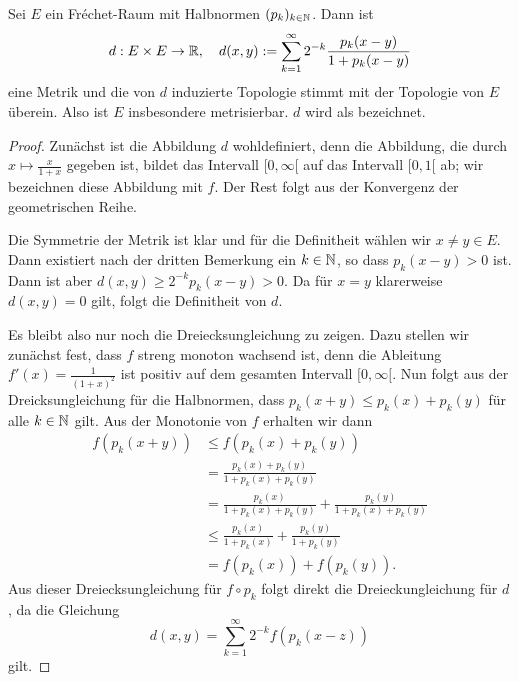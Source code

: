 \begin{prop}
  \label{prop:frechet-metrik}
  Sei $E$ ein Fr\'echet-Raum mit Halbnormen $(p_k)_{k \in \mathbb{N}}$. Dann
  ist
  \[
  d: E \times E \rightarrow \mathbb{R}, \quad d(x,y) := \sum_{k=1}^\infty 2^{-k}
  \frac{p_k(x-y)}{1 + p_k(x-y)}
  \]
  eine Metrik und die von $d$ induzierte Topologie stimmt mit der
  Topologie von $E$ überein. Also ist $E$ insbesondere
  metrisierbar. $d$ wird als  bezeichnet.
\end{prop}

\begin{proof}
  Zunächst ist die Abbildung $d$ wohldefiniert, denn die Abbildung,
  die durch $x \mapsto \frac{x}{1+x}$ gegeben ist, bildet das
  Intervall $[0, \infty[$ auf das Intervall $[0,1[$ ab; wir bezeichnen
  diese Abbildung mit $f$. Der Rest folgt
  aus der Konvergenz der geometrischen Reihe.

  Die Symmetrie der Metrik ist klar und für die Definitheit wählen wir
  $x\neq y \in E$. Dann existiert nach der dritten Bemerkung ein $k \in
  \mathbb{N}$, so dass $p_k(x-y) >0$ ist. Dann ist aber $d(x,y) \geq
  2^{-k}p_k(x-y) > 0$. Da für $x =y$ klarerweise $d(x,y) =0$ gilt,
  folgt die Definitheit von $d$.

  Es bleibt also nur noch die
  Dreiecksungleichung zu zeigen. Dazu stellen wir zunächst fest, dass
  $f$ streng monoton wachsend ist, denn die Ableitung $f'(x) =
  \frac{1}{(1+x)^2}$ ist positiv auf dem gesamten Intervall $[0,
  \infty[$. Nun folgt aus der Dreicksungleichung für die Halbnormen,
  dass $p_k(x+y) \leq p_k(x) + p_k(y)$ für alle $k \in \mathbb{N}$ gilt. Aus
  der Monotonie von $f$ erhalten wir dann
  \begin{align*}
    f(p_k(x+y)) & \leq f(p_k(x) + p_k(y)) \\
    & = \frac{ p_k(x) + p_k(y)}{1 + p_k(x) + p_k(y)}\\
    & = \frac{p_k(x)}{1+ p_k(x)+p_k(y)} + \frac{p_k(y)}{1+p_k(x) +
      p_k(y)} \\
    & \leq \frac{p_k(x)}{1+p_k(x)} + \frac{p_k(y)}{1+ p_k(y)} \\
    & = f(p_k(x)) + f(p_k(y)).
  \end{align*}
  Aus dieser Dreiecksungleichung für $f \circ p_k$ folgt direkt die
  Dreieckungleichung für $d$, da die Gleichung
  \[
  d(x,y) = \sum_{k=1}^\infty 2^{-k}f(p_k(x-z))
  \]
  gilt.
  

\end{proof}

